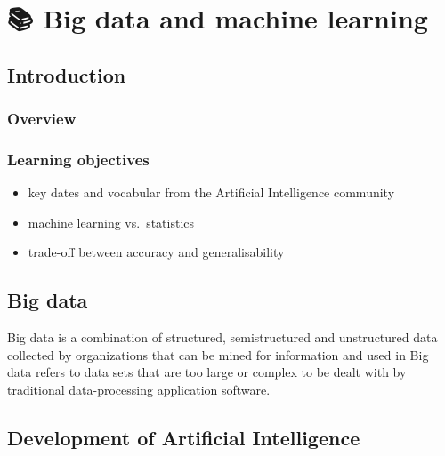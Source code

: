 \documentclass[
  letterpaper,
  DIV=11,
  numbers=noendperiod,
  oneside]{scrreprt}
\begin{document}
\hypertarget{big-data-and-machine-learning}{%
\chapter{\texorpdfstring{{📚} Big data and machine
learning}{📚 Big data and machine learning}}\label{big-data-and-machine-learning}}

\hypertarget{introduction-15}{%
\section{Introduction}\label{introduction-15}}

\hypertarget{overview-8}{%
\subsection{Overview}\label{overview-8}}

\hypertarget{learning-objectives-9}{%
\subsection{Learning objectives}\label{learning-objectives-9}}

\begin{itemize}
\item
  key dates and vocabular from the Artificial Intelligence community
\item
  machine learning vs.~statistics
\item
  trade-off between accuracy and generalisability
\end{itemize}

\hypertarget{big-data}{%
\section{Big data}\label{big-data}}

Big data is a combination of structured, semistructured and unstructured
data collected by organizations that can be mined for information and
used in Big data refers to data sets that are too large or complex to be
dealt with by traditional data-processing application software.

\hypertarget{development-of-artificial-intelligence}{%
\section{Development of Artificial
Intelligence}\label{development-of-artificial-intelligence}}
\end{document}
